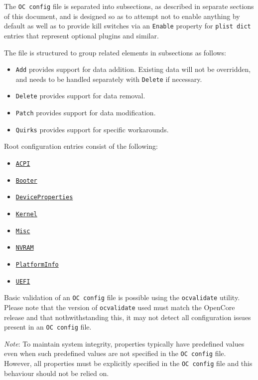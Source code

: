 \documentclass[]{article}
\providecommand{\tightlist}{%
  \setlength{\itemsep}{0pt}\setlength{\parskip}{0pt}}
\begin{document}
The \texttt{OC\ config} file is separated into subsections, as described in
separate sections of this document, and is designed so as to attempt not to
enable anything by default as well as to provide kill switches via an \texttt{Enable}
property for \texttt{plist dict} entries that represent optional plugins and similar.

The file is structured to group related elements in subsections as follows:

\begin{itemize}
\tightlist
\item
  \texttt{Add} provides support for data addition. Existing data will
  not be overridden, and needs to be handled separately with
  \texttt{Delete} if necessary.
\item
  \texttt{Delete} provides support for data removal.
\item
  \texttt{Patch} provides support for data modification.
\item
  \texttt{Quirks} provides support for specific workarounds.
\end{itemize}

Root configuration entries consist of the following:

\begin{itemize}
\tightlist
\item
  \hyperref[acpi]{\texttt{ACPI}}
\item
  \hyperref[booter]{\texttt{Booter}}
\item
  \hyperref[devprops]{\texttt{DeviceProperties}}
\item
  \hyperref[kernel]{\texttt{Kernel}}
\item
  \hyperref[misc]{\texttt{Misc}}
\item
  \hyperref[nvram]{\texttt{NVRAM}}
\item
  \hyperref[platforminfo]{\texttt{PlatformInfo}}
\item
  \hyperref[uefi]{\texttt{UEFI}}
\end{itemize}

Basic validation of an \texttt{OC\ config} file is possible using
the \texttt{ocvalidate} utility. Please note that the version of \texttt{ocvalidate}
used must match the OpenCore release and that nothwithstanding this, it may not
detect all configuration issues present in an \texttt{OC\ config} file.

\emph{Note}: To maintain system integrity, properties typically have predefined values even
when such predefined values are not specified in the \texttt{OC\ config} file. However, all
properties must be explicitly specified in the \texttt{OC\ config} file and this behaviour
should not be relied on.
\end{document}
